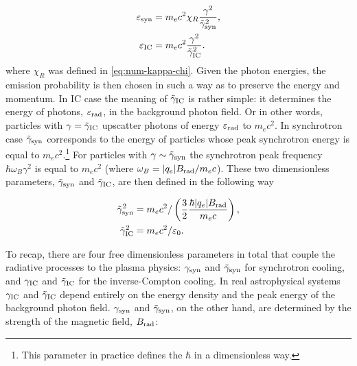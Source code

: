 \begin{equation}
    \begin{aligned}
        \varepsilon_{\rm syn} &= m_e c^2 \chi_R\frac{\gamma^2}{\tilde{\gamma}_{\rm syn}^2},\\
        \varepsilon_{\rm IC} &= m_e c^2 \frac{\gamma^2}{\tilde{\gamma}_{\rm IC}^2}.
    \end{aligned}
\end{equation}
\noindent where $\chi_R$ was defined in \eqref{eq:num-kappa-chi}. Given the photon energies, the emission probability is then chosen in such a way as to preserve the energy and momentum. In IC case the meaning of $\tilde{\gamma}_{\rm IC}$ is rather simple: it determines the energy of photons, $\varepsilon_{\rm rad}$, in the background photon field. Or in other words, particles with $\gamma=\tilde{\gamma}_{\rm IC}$ upscatter photons of energy $\varepsilon_{\rm rad}$ to $m_e c^2$. In synchrotron case $\tilde{\gamma}_{\rm syn}$ corresponds to the energy of particles whose peak synchrotron energy is equal to $m_e c^2$.\footnote{This parameter in practice defines the $\hbar$ in a dimensionless way.} For particles with $\gamma\sim \tilde{\gamma}_{\rm syn}$ the synchrotron peak frequency $\hbar \omega_B \gamma^2$ is equal to $m_e c^2$ (where $\omega_B = |q_e| B_{\rm rad} / m_e c$). These two dimensionless parameters, $\tilde{\gamma}_{\rm syn}$ and $\tilde{\gamma}_{\rm IC}$, are then defined in the following way

\begin{equation}
\begin{aligned}
    \tilde{\gamma}_{\rm syn}^2 &= m_e c^2 / \left(\frac{3}{2}\frac{\hbar |q_e| B_{\rm rad}}{m_e c}\right),\\
    \tilde{\gamma}_{\rm IC}^2 &= m_e c^2 / \varepsilon_0. 
\end{aligned}
\end{equation}

To recap, there are four free dimensionless parameters in total that couple the radiative processes to the plasma physics: $\gamma_{\rm syn}$ and $\tilde{\gamma}_{\rm syn}$ for synchrotron cooling, and $\gamma_{\rm IC}$ and $\tilde{\gamma}_{\rm IC}$ for the inverse-Compton cooling. In real astrophysical systems $\gamma_{\rm IC}$ and $\tilde{\gamma}_{\rm IC}$ depend entirely on the energy density and the peak energy of the background photon field. $\gamma_{\rm syn}$ and $\tilde{\gamma}_{\rm syn}$, on the other hand, are determined by the strength of the magnetic field, $B_{\rm rad}$:

